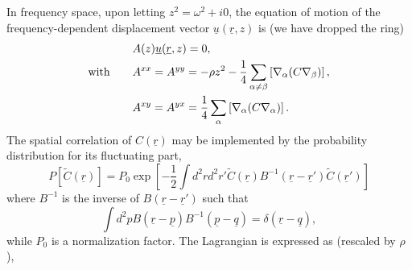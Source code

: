 \documentclass[twoside,twocolumn,9pt]{article}
\begin{document}
In frequency space, upon letting $z^2=\omega^2+i0$, the equation of motion of the frequency-dependent displacement vector $\underline{u}(\underline{r},z)$ is (we have dropped the ring)
\begin{align}
&A(z)\underline{u}(\underline{r},z)=0,\notag\\
\textup{with}\qquad &A^{xx}=A^{yy}=-\rho z^2-\frac{1}{4}\sum_{\alpha\neq\beta}\left[\nabla_\alpha(C\nabla_\beta)\right], \notag\\
&A^{xy}=A^{yx}=\frac{1}{4}\sum_\alpha\left[\nabla_\alpha(C\nabla_\alpha)\right].
\end{align}
The spatial correlation of $C(\underline{r})$ may be implemented by the probability distribution for its fluctuating part,
\begin{equation}
P[\tilde{C}(\underline{r})]=P_0\exp\left[-\frac{1}{2}\int d^2rd^2r'\tilde{C}(\underline{r})B^{-1}(\underline{r}-\underline{r}')\tilde{C}(\underline{r}')\right]
\end{equation}
where $B^{-1}$ is the inverse of $B(\underline{r}-\underline{r}')$ such that
\begin{equation}
\int d^2pB(\underline{r}-\underline{p})B^{-1}(\underline{p}-\underline{q})=\delta(\underline{r}-\underline{q}),
\end{equation}
while $P_0$ is a normalization factor. The Lagrangian is expressed as (rescaled by $\rho$),
\end{document}
